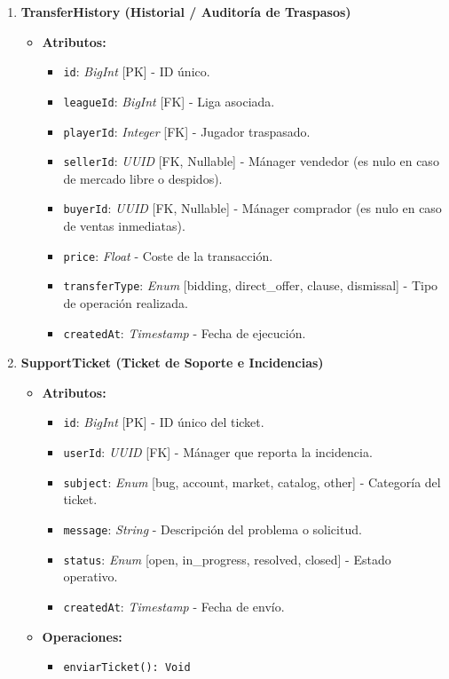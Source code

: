 \begin{enumerate}
    \item \textbf{TransferHistory (Historial / Auditoría de Traspasos)}
    \begin{itemize}
        \item \textbf{Atributos:}
            \begin{itemize}
                \item \texttt{id}: \textit{BigInt} [PK] - ID único.
                \item \texttt{leagueId}: \textit{BigInt} [FK] - Liga asociada.
                \item \texttt{playerId}: \textit{Integer} [FK] - Jugador traspasado.
                \item \texttt{sellerId}: \textit{UUID} [FK, Nullable] - Mánager vendedor (es nulo en caso de mercado libre o despidos).
                \item \texttt{buyerId}: \textit{UUID} [FK, Nullable] - Mánager comprador (es nulo en caso de ventas inmediatas).
                \item \texttt{price}: \textit{Float} - Coste de la transacción.
                \item \texttt{transferType}: \textit{Enum} [bidding, direct\_offer, clause, dismissal] - Tipo de operación realizada.
                \item \texttt{createdAt}: \textit{Timestamp} - Fecha de ejecución.
            \end{itemize}
    \end{itemize}

    \item \textbf{SupportTicket (Ticket de Soporte e Incidencias)}
    \begin{itemize}
        \item \textbf{Atributos:}
            \begin{itemize}
                \item \texttt{id}: \textit{BigInt} [PK] - ID único del ticket.
                \item \texttt{userId}: \textit{UUID} [FK] - Mánager que reporta la incidencia.
                \item \texttt{subject}: \textit{Enum} [bug, account, market, catalog, other] - Categoría del ticket.
                \item \texttt{message}: \textit{String} - Descripción del problema o solicitud.
                \item \texttt{status}: \textit{Enum} [open, in\_progress, resolved, closed] - Estado operativo.
                \item \texttt{createdAt}: \textit{Timestamp} - Fecha de envío.
            \end{itemize}
        \item \textbf{Operaciones:}
            \begin{itemize}
                \item \texttt{enviarTicket(): Void}
            \end{itemize}
    \end{itemize}
\end{enumerate}

